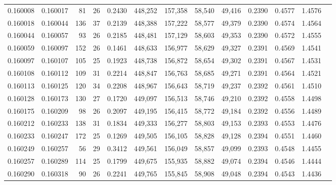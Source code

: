 \begin{tabular}{rrrrrrrrrrrrr}
0.160008 & 0.160017 &    81 &  26 &                                     0.2430 & 448,252 & 157,358 &  58,540 &  49,416 & 0.2390 & 0.4577 & 1.4576 \\
0.160018 & 0.160044 &   136 &  37 &                                     0.2139 & 448,388 & 157,222 &  58,577 &  49,379 & 0.2390 & 0.4574 & 1.4564 \\
0.160044 & 0.160057 &    93 &  26 &                                     0.2185 & 448,481 & 157,129 &  58,603 &  49,353 & 0.2390 & 0.4572 & 1.4555 \\
0.160059 & 0.160097 &   152 &  26 &                                     0.1461 & 448,633 & 156,977 &  58,629 &  49,327 & 0.2391 & 0.4569 & 1.4541 \\
0.160097 & 0.160107 &   105 &  25 &                                     0.1923 & 448,738 & 156,872 &  58,654 &  49,302 & 0.2391 & 0.4567 & 1.4531 \\
0.160108 & 0.160112 &   109 &  31 &                                     0.2214 & 448,847 & 156,763 &  58,685 &  49,271 & 0.2391 & 0.4564 & 1.4521 \\
0.160113 & 0.160125 &   120 &  34 &                                     0.2208 & 448,967 & 156,643 &  58,719 &  49,237 & 0.2392 & 0.4561 & 1.4510 \\
0.160128 & 0.160173 &   130 &  27 &                                     0.1720 & 449,097 & 156,513 &  58,746 &  49,210 & 0.2392 & 0.4558 & 1.4498 \\
0.160175 & 0.160209 &    98 &  26 &                                     0.2097 & 449,195 & 156,415 &  58,772 &  49,184 & 0.2392 & 0.4556 & 1.4489 \\
0.160212 & 0.160233 &   138 &  31 &                                     0.1834 & 449,333 & 156,277 &  58,803 &  49,153 & 0.2393 & 0.4553 & 1.4476 \\
0.160233 & 0.160247 &   172 &  25 &                                     0.1269 & 449,505 & 156,105 &  58,828 &  49,128 & 0.2394 & 0.4551 & 1.4460 \\
0.160249 & 0.160257 &    56 &  29 &                                     0.3412 & 449,561 & 156,049 &  58,857 &  49,099 & 0.2393 & 0.4548 & 1.4455 \\
0.160257 & 0.160289 &   114 &  25 &                                     0.1799 & 449,675 & 155,935 &  58,882 &  49,074 & 0.2394 & 0.4546 & 1.4444 \\
0.160290 & 0.160318 &    90 &  26 &                                     0.2241 & 449,765 & 155,845 &  58,908 &  49,048 & 0.2394 & 0.4543 & 1.4436 \\

\end{tabular}
